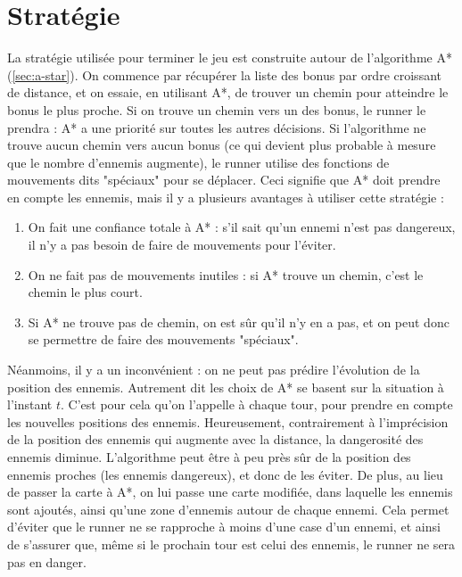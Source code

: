 \chapter{Stratégie}
\label{cp:strategie}

La stratégie utilisée pour terminer le jeu est construite autour de l'algorithme A* (\autoref{sec:a-star}).
\newline
On commence par récupérer la liste des bonus par ordre croissant de distance, et on essaie, en utilisant A*, de trouver un chemin pour atteindre le bonus le plus proche.
\newline
Si on trouve un chemin vers un des bonus, le runner le prendra : A* a une priorité sur toutes les autres décisions.
\newline
Si l'algorithme ne trouve aucun chemin vers aucun bonus (ce qui devient plus probable à mesure que le nombre d'ennemis augmente), le runner utilise des fonctions de mouvements dits "spéciaux" pour se déplacer.
\newline\newline
Ceci signifie que A* doit prendre en compte les ennemis, mais il y a plusieurs avantages à utiliser cette stratégie :

\begin{enumerate}
    \item On fait une confiance totale à A* : s'il sait qu'un ennemi n'est pas dangereux, il n'y a pas besoin de faire de mouvements pour l'éviter.
    \item On ne fait pas de mouvements inutiles : si A* trouve un chemin, c'est le chemin le plus court.
    \item Si A* ne trouve pas de chemin, on est sûr qu'il n'y en a pas, et on peut donc se permettre de faire des mouvements "spéciaux".
\end{enumerate}
Néanmoins, il y a un inconvénient : on ne peut pas prédire l'évolution de la position des ennemis.
Autrement dit les choix de A* se basent sur la situation à l'instant $t$.
\newline
C'est pour cela qu'on l'appelle à chaque tour, pour prendre en compte les nouvelles positions des ennemis.
\newline\newline
Heureusement, contrairement à l'imprécision de la position des ennemis qui augmente avec la distance, la dangerosité des ennemis diminue.
L'algorithme peut être à peu près sûr de la position des ennemis proches (les ennemis dangereux), et donc de les éviter.
\newpage
De plus, au lieu de passer la carte à A*, on lui passe une carte modifiée, dans laquelle les ennemis sont ajoutés, ainsi qu'une zone d'ennemis autour de chaque ennemi.
\newline
Cela permet d'éviter que le runner ne se rapproche à moins d'une case d'un ennemi, et ainsi de s'assurer que, même si le prochain tour est celui des ennemis, le runner ne sera pas en danger.

